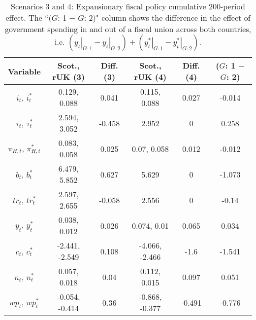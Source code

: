 \begin{table}[H]
\centering
\begin{tabular}{c|cc|cc|c}
  \hline
{\textbf{Variable}} & {\textbf{Scot., rUK (3)}} & {\textbf{Diff. (3)}} & {\textbf{Scot., rUK (4)}} & {\textbf{Diff. (4)}} & {\textbf{($G$: 1 $-$ $G$: 2)}} \\ 
  \hline
${i_t}$, ${i^*_t}$ & 0.129, 0.088 & 0.041 & 0.115, 0.088 & 0.027 & -0.014 \\ 
  ${\tau_t}$, ${\tau^*_t}$ & 2.594, 3.052 & -0.458 & 2.952 & 0 & 0.258 \\ 
  ${\pi_{H,t}}$, ${\pi^*_{H,t}}$ & 0.083, 0.058 & 0.025 & 0.07, 0.058 & 0.012 & -0.012 \\ 
  ${b_t}$, ${b^*_t}$ & 6.479, 5.852 & 0.627 & 5.629 & 0 & -1.073 \\ 
  ${tr_t}$, ${tr^*_t}$ & 2.597, 2.655 & -0.058 & 2.556 & 0 & -0.14 \\ 
  ${y_t}$, ${y^*_t}$ & 0.038, 0.012 & 0.026 & 0.074, 0.01 & 0.065 & 0.034 \\ 
  ${c_t}$, ${c^*_t}$ & -2.441, -2.549 & 0.108 & -4.066, -2.466 & -1.6 & -1.541 \\ 
  ${n_t}$, ${n^*_t}$ & 0.057, 0.018 & 0.04 & 0.112, 0.015 & 0.097 & 0.051 \\ 
  ${wp_t}$, ${wp^*_t}$ & -0.054, -0.414 & 0.36 & -0.868, -0.377 & -0.491 & -0.776 \\ 
\end{tabular}
\vspace{0.5cm}
\caption{Scenarios 3 and 4: Expansionary fiscal policy cumulative 200-period effect. The ``$(G$: 1 $-$ $G$: 2)" column shows the difference in the effect of government spending in and out of a fiscal union across both countries, i.e. $(\left. y_t \right|_{G:1} - \left. y_t \right|_{G:2}) + (\left. y^*_t \right|_{G:1} - \left. y^*_t \right|_{G:2})$.} 
\label{table:responses_three_four}
\end{table}

